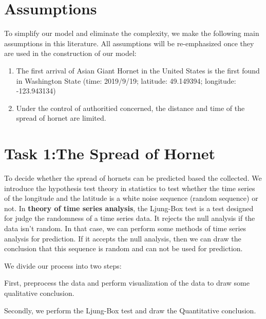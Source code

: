 \documentclass[12pt]{article}
\begin{document}
\section{Assumptions}

To simplify our model and eliminate the complexity, we make the following main assumptions in this literature. All assumptions will be re-emphasized once they are used in the construction of our model:
\begin{enumerate}[\bfseries 1.]
	\item The first arrival of Asian Giant Hornet in the United States is the first found in Washington State (time: 2019/9/19; latitude: 49.149394; longitude: -123.943134)
	\item Under the control of authoritied concerned, the distance and time of the spread of hornet are limited.
\end{enumerate}



\section{Task 1:The Spread of Hornet}

To decide whether the spread of hornets can be predicted based the collected. We introduce the hypothesis test theory in statistics to test whether the time series of the longitude and the latitude is a white noise sequence (random sequence) or not. In \textbf{theory of time series analysis}, the Ljung-Box test is a test designed for judge the randomness of a time series data. It rejects  the null analysis if the data isn’t random. In that case, we can perform some methods of time series analysis for prediction. If it accepts the null analysis, then we can draw the conclusion that this sequence is random and can not be used for prediction.

We divide our process into two steps: 

First, preprocess the data and perform visualization of the data to draw some qualitative conclusion.

Secondly, we perform the Ljung-Box test and draw the Quantitative conclusion.
\end{document}
